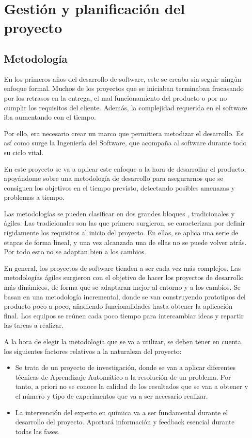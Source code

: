 \chapter{Gestión y planificación del proyecto}

\section{Metodología}

En los primeros años del desarrollo de software, este se creaba sin seguir ningún enfoque formal. Muchos de los proyectos que se iniciaban terminaban fracasando por los retrasos en la entrega, el mal funcionamiento del producto o por no cumplir los requisitos del cliente. Además, la complejidad requerida en el software iba aumentando con el tiempo. 

Por ello, era necesario crear un marco que permitiera metodizar el desarrollo. Es así como surge la Ingeniería del Software, que acompaña al software durante todo su ciclo vital.

En este proyecto se va a aplicar este enfoque a la hora de desarrollar el producto, apoyándome sobre una metodología de desarrollo para asegurarnos que se consiguen los objetivos en el tiempo previsto, detectando posibles amenazas y problemas a tiempo.

Las metodologías se pueden clasificar en dos grandes bloques \cite{metodologiasDesarrollo}, tradicionales y ágiles. Las tradicionales son las que primero surgieron, se caracterizan por definir rígidamente los requisitos al inicio del proyecto. En ellas, se aplica una serie de etapas de forma lineal, y una vez alcanzada una de ellas no se puede volver atrás. Por todo esto no se adaptan bien a los cambios.

En general, los proyectos de software tienden a ser cada vez más complejos. Las metodologías ágiles surgieron con el objetivo de hacer los proyectos de desarrollo más dinámicos, de forma que se adaptaran mejor al entorno y a los cambios. Se basan en una metodología incremental, donde se van construyendo prototipos del producto poco a poco, añadiendo funcionalidades hasta obtener la aplicación final. Los equipos se reúnen cada poco tiempo para intercambiar ideas y repartir las tareas a realizar.

A la hora de elegir la metodología que se va a utilizar, se deben tener en cuenta los siguientes factores relativos a la naturaleza del proyecto:

\begin{itemize}
    \item Se trata de un proyecto de investigación, donde se van a aplicar diferentes técnicas de Aprendizaje Automático a la resolución de un problema. Por tanto, a priori no se conoce la calidad de los resultados que se van a obtener y el número y tipo de experimentos que va a ser necesario realizar.
    \item La intervención del experto en química va a ser fundamental durante el desarrollo del proyecto. Aportará información y feedback esencial durante todas las fases.
\end{itemize}

